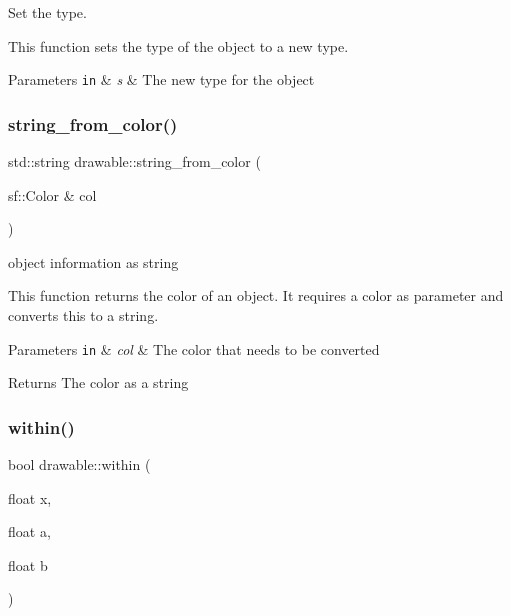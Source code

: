 Set the type. 

This function sets the type of the object to a new type.


\begin{DoxyParams}[1]{Parameters}
\mbox{\tt in}  & {\em s} & The new type for the object \\
\hline
\end{DoxyParams}
\mbox{\label{classdrawable_add3d8569fe2616ae0ed503b19c92c08e}} 
\subsubsection{\texorpdfstring{string\+\_\+from\+\_\+color()}{string\_from\_color()}}
{\footnotesize\ttfamily std\+::string drawable\+::string\+\_\+from\+\_\+color (\begin{DoxyParamCaption}\item[{sf\+::\+Color \&}]{col }\end{DoxyParamCaption})\hspace{0.3cm}{\ttfamily [virtual]}}



object information as string 

This function returns the color of an object. It requires a color as parameter and converts this to a string.


\begin{DoxyParams}[1]{Parameters}
\mbox{\tt in}  & {\em col} & The color that needs to be converted \\
\hline
\end{DoxyParams}
\begin{DoxyReturn}{Returns}
The color as a string 
\end{DoxyReturn}
\mbox{\label{classdrawable_a0d3278e4e888fc8289468e8893dd8329}} 
\subsubsection{\texorpdfstring{within()}{within()}}
{\footnotesize\ttfamily bool drawable\+::within (\begin{DoxyParamCaption}\item[{float}]{x,  }\item[{float}]{a,  }\item[{float}]{b }\end{DoxyParamCaption})\hspace{0.3cm}{\ttfamily [virtual]}}



